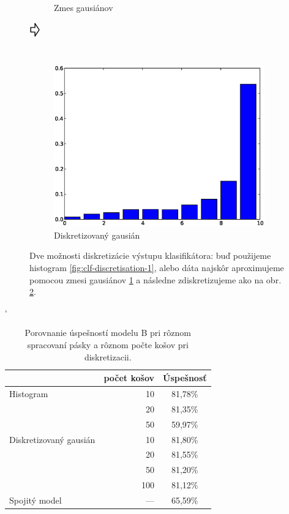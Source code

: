 \begin{figure}[htp]
\begin{subfigure}[c]{0.3\textwidth}
                \caption{Zmes gausiánov}
                \label{fig:clf-discretisation-2}
        \end{subfigure}
        $\vcenter{\hbox{\raisebox{.8cm}{\Huge\pointer}}}$
        \begin{subfigure}[c]{0.3\textwidth}
                \includegraphics[width=\textwidth]{images/hist3}
                \caption{Diskretizovaný gausián}
                \label{fig:clf-discretisation-3}
        \end{subfigure}
        \caption[Diskretizácia výstupu klasifikátora]{Dve možnosti diskretizácie výstupu klasifikátora: buď použijeme histogram \ref{fig:clf-discretisation-1}, alebo dáta najskôr aproximujeme pomocou zmesi gausiánov \ref{fig:clf-discretisation-2} a následne zdiskretizujeme ako na obr. \ref{fig:clf-discretisation-3}.}
        \label{fig:clf-discretisation}
\end{figure}

\begin{table}[h]
\catcode`
\centering
\begin{tabular}{lrc}
\toprule
& počet košov & Úspešnosť\\
\midrule
Histogram & 10 & 81,78\%\\
 & 20 & 81,35\%\\
 & 50 & 59,97\%\\
Diskretizovaný gausián & 10 & 81,80\%\\
 & 20 & 81,55\%\\
 & 50 & 81,20\%\\
 & 100 & 81,12\%\\
Spojitý model & --- & 65,59\%\\
\bottomrule
\end{tabular}
\vspace{0.5cm}
\caption[Porovnanie úspešností pri rôznom spracovaní pásky]{Porovnanie úspešností modelu B pri rôznom spracovaní pásky a rôznom počte košov pri diskretizacii.}
\label{tab:success-b-tape}
\end{table}

